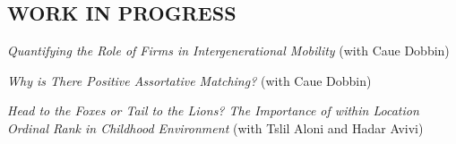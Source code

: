 \documentclass[margin]{res} %
\newcommand{\rootFolder}{/Users/tomzohar/Dropbox/}
\begin{document}
\begin{resume}

\subsection{WORK IN PROGRESS}

\textit{Quantifying the Role of Firms in Intergenerational Mobility} (with Caue Dobbin) 

%

%

\textit{Why is There Positive Assortative Matching?} (with Caue Dobbin) 

\textit{Head to the Foxes or Tail to the Lions? The Importance of within Location Ordinal Rank in Childhood Environment} (with Tslil Aloni and Hadar Avivi)






\end{resume}
\end{document}
